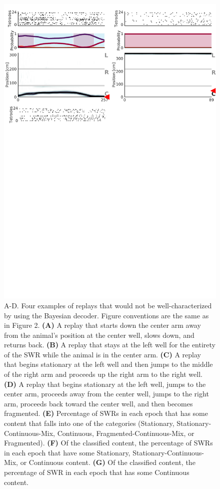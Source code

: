 \documentclass[times, twoside]{zHenriquesLab-StyleBioRxiv}
\begin{document}
\begin{figure}%
\centering
\includegraphics[width=0.80\linewidth]{figures/Figure3/Figure3_v4}
\caption{A-D. Four examples of replays that would not be well-characterized by using the Bayesian decoder. Figure conventions are the same as in Figure 2. \textbf{(A)} A replay that starts down the center arm away from the animal's position at the center well, slows down, and returns back. \textbf{(B)} A replay that stays at the left well for the entirety of the SWR while the animal is in the center arm. \textbf{(C)} A replay that begins stationary at the left well and then jumps to the middle of the right arm and proceeds up the right arm to the right well. \textbf{(D)} A replay that begins stationary at the left well, jumps to the center arm, proceeds away from the center well, jumps to the right arm, proceeds back toward the center well, and then becomes fragmented. \textbf{(E)} Percentage of SWRs in each epoch that has some content that falls into one of the categories (Stationary, Stationary-Continuous-Mix, Continuous, Fragmented-Continuous-Mix, or Fragmented). \textbf{(F)} Of the classified content, the percentage of SWRs in each epoch that have some Stationary, Stationary-Continuous-Mix, or Continuous content. \textbf{(G)} Of the classified content, the percentage of SWR in each epoch that has some Continuous content.
}
\label{3}
\end{figure}
\end{document}
